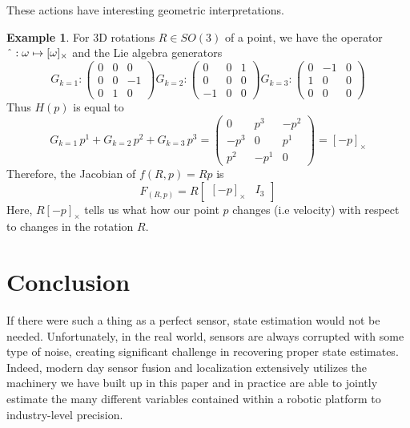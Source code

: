 \documentclass[reqno]{amsart}
\theoremstyle{definition}
\newtheorem{exmp}{Example}[section]
\numberwithin{equation}{section}
\begin{document}
These actions have interesting geometric interpretations.

\begin{exmp}
    For 3D rotations $R \in SO(3)$ of a point, we have the operator $\string^ : \omega \mapsto [\omega]_{\times}$ and the Lie algebra generators
    \begin{equation*}
        G_{k=1}:\begin{pmatrix}
            0 & 0 & 0 \\
            0 & 0 & -1 \\
            0 & 1 & 0
        \end{pmatrix}
        G_{k=2}:\begin{pmatrix}
            0 & 0 & 1 \\
            0 & 0 & 0 \\
            -1 & 0 & 0
        \end{pmatrix}
        G_{k=3}:\begin{pmatrix}
            0 & -1 & 0 \\
            1 & 0 & 0 \\
            0 & 0 & 0
        \end{pmatrix}
    \end{equation*}
    Thus $H(p)$ is equal to
    \begin{equation*}
        G_{k=1}\,p^1 + G_{k=2}\,p^2 + G_{k=3}\,p^3
        = \begin{pmatrix}
            0 & p^3 & -p^2 \\
            -p^3 & 0 & p^1 \\
            p^2 & -p^1 & 0
        \end{pmatrix} = [-p]_{\times}
    \end{equation*}
    Therefore, the Jacobian of $f(R, p) = Rp$ is
    \begin{equation*}
        F_{(R, p)} = R\begin{bmatrix}
            [-p]_{\times} & I_3
        \end{bmatrix}
    \end{equation*}
    Here, $R[-p]_{\times}$ tells us what how our point $p$ changes (i.e velocity) with respect to changes in the rotation $R$.
\end{exmp}

\section{Conclusion}

If there were such a thing as a perfect sensor, state estimation would not be needed. Unfortunately, in the real world, sensors are always corrupted with some type of noise, creating significant challenge in recovering proper state estimates. Indeed, modern day sensor fusion and localization extensively utilizes the machinery we have built up in this paper and in practice are able to jointly estimate the many different variables contained within a robotic platform to industry-level precision.
\end{document}
